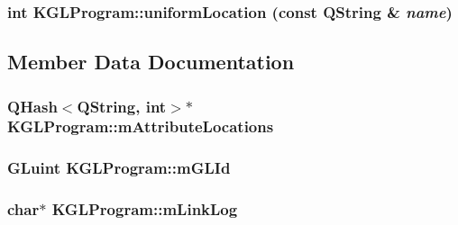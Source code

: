 \hypertarget{class_k_g_l_program_51a6b83fc54f4364ae013068823a981d}{
\subsubsection[{uniformLocation}]{\setlength{\rightskip}{0pt plus 5cm}int KGLProgram::uniformLocation (const QString \& {\em name})}}
\label{class_k_g_l_program_51a6b83fc54f4364ae013068823a981d}




\subsection{Member Data Documentation}
\hypertarget{class_k_g_l_program_7ebfd6e8476719c40d24108a043d7bd1}{
\subsubsection[{mAttributeLocations}]{\setlength{\rightskip}{0pt plus 5cm}QHash$<$QString, int$>$$\ast$ {\bf KGLProgram::mAttributeLocations}}}
\label{class_k_g_l_program_7ebfd6e8476719c40d24108a043d7bd1}


\hypertarget{class_k_g_l_program_1200bdd28e580ca66b818dbefee24f22}{
\subsubsection[{mGLId}]{\setlength{\rightskip}{0pt plus 5cm}GLuint {\bf KGLProgram::mGLId}}}
\label{class_k_g_l_program_1200bdd28e580ca66b818dbefee24f22}


\hypertarget{class_k_g_l_program_af8102a5a3f4c7bb21f3f0c56c6806a4}{
\subsubsection[{mLinkLog}]{\setlength{\rightskip}{0pt plus 5cm}char$\ast$ {\bf KGLProgram::mLinkLog}}}
\label{class_k_g_l_program_af8102a5a3f4c7bb21f3f0c56c6806a4}


